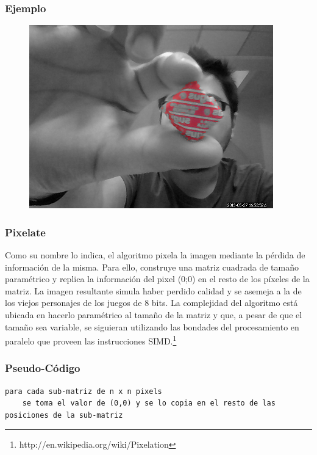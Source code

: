 \subsubsection*{Ejemplo}
\begin{center}
  \begin{figure}[H]
  \includegraphics[scale=0.60]{imgs/bona.png}
  \end{figure}  
\end{center}  

\subsubsection{Pixelate}

Como su nombre lo indica, el algoritmo pixela la imagen mediante la p\'erdida de informaci\'on de la misma. Para ello, construye una matriz cuadrada de tamaño param\'etrico y replica la informaci\'on del pixel (0;0) en el resto de los p\'ixeles de la matriz. La imagen resultante simula haber perdido calidad y se asemeja a la de los viejos personajes de los juegos de 8 bits. La complejidad del algoritmo est\'a ubicada en hacerlo param\'etrico al tamaño de la matriz y que, a pesar de que el tamaño sea variable, se siguieran utilizando las bondades del procesamiento en paralelo que proveen las instrucciones SIMD.\footnote{http://en.wikipedia.org/wiki/Pixelation}

\subsubsection*{Pseudo-C\'odigo}
\begin{verbatim}
para cada sub-matriz de n x n pixels
    se toma el valor de (0,0) y se lo copia en el resto de las posiciones de la sub-matriz
\end{verbatim}

